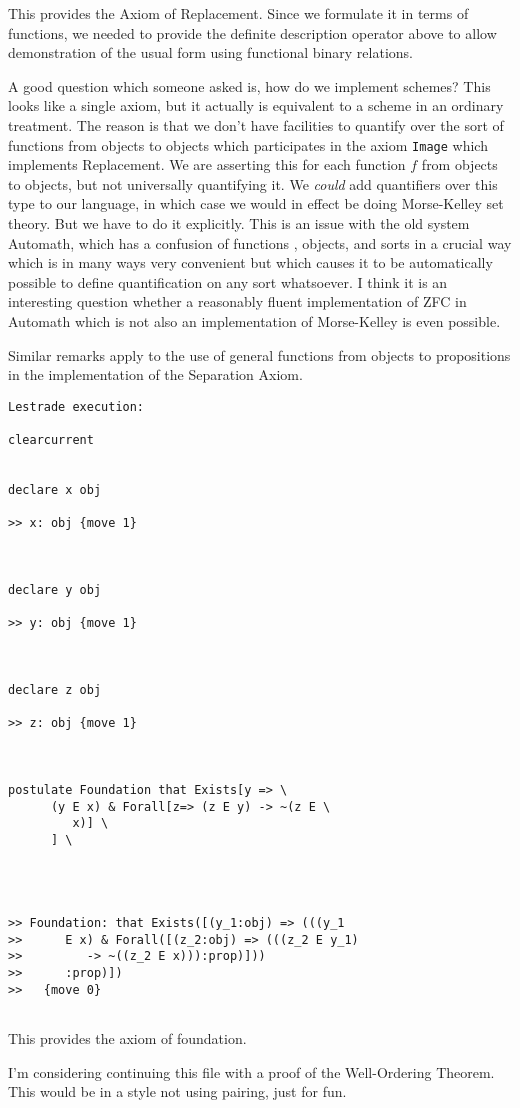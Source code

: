 \documentclass{article}
\begin{document}
This provides the Axiom of Replacement.  Since we formulate it in terms of functions, we needed to provide the definite description operator above  to allow demonstration of the usual form using functional binary relations.

A good question which someone asked is, how do we implement schemes?  This looks like a single axiom, but it actually is equivalent to a scheme in an ordinary treatment.  The reason is that we don't have facilities to quantify over the sort of functions from objects to objects which participates in the axiom {\tt Image} which implements Replacement.   We are asserting this for each function $f$ from objects to objects, but not universally quantifying it.  We {\em could\/} add quantifiers over this type to our language, in which case we would in effect be doing Morse-Kelley set theory.  But we have to do it explicitly.   This is an issue with the old system Automath, which has a confusion of functions , objects, and sorts in a crucial way which is in many ways very convenient but which causes it to be automatically possible to define quantification on any sort whatsoever.  I think it is an interesting question whether a reasonably fluent implementation of ZFC in Automath which is not also an implementation of Morse-Kelley is even possible.

Similar remarks apply to the use of general functions from objects to propositions in the implementation of the Separation Axiom.

\begin{verbatim}Lestrade execution:

clearcurrent


declare x obj

>> x: obj {move 1}



declare y obj

>> y: obj {move 1}



declare z obj

>> z: obj {move 1}



postulate Foundation that Exists[y => \
      (y E x) & Forall[z=> (z E y) -> ~(z E \
         x)] \
      ] \
   



>> Foundation: that Exists([(y_1:obj) => (((y_1
>>      E x) & Forall([(z_2:obj) => (((z_2 E y_1)
>>         -> ~((z_2 E x))):prop)]))
>>      :prop)])
>>   {move 0}


\end{verbatim}

This provides the axiom of foundation.

I'm considering continuing this file with a proof of the Well-Ordering Theorem.  This would be in a style not using pairing, just for fun.
\end{document}
